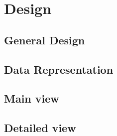 \section{Design}\label{sec:des}
\subsection{General Design}
\subsection{Data Representation}
\subsection{Main view}
\subsection{Detailed view}

